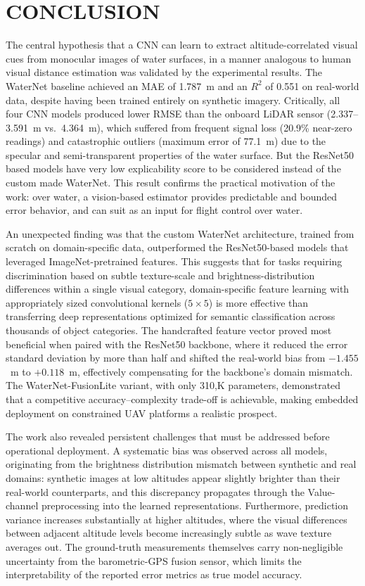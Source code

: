 \section{CONCLUSION}

The central hypothesis that a CNN can learn to extract altitude-correlated visual cues from monocular images of water surfaces, in a manner analogous to human visual distance estimation was validated by the experimental results. The WaterNet baseline achieved an MAE of 1.787~m and an $R^2$ of 0.551 on real-world data, despite having been trained entirely on synthetic imagery. Critically, all four CNN models produced lower RMSE than the onboard LiDAR sensor (2.337--3.591~m vs.\ 4.364~m), which suffered from frequent signal loss (20.9\% near-zero readings) and catastrophic outliers (maximum error of 77.1~m) due to the specular and semi-transparent properties of the water surface. But the ResNet50 based models have very low explicability score to be considered instead of the custom made WaterNet. This result confirms the practical motivation of the work: over water, a vision-based estimator provides predictable and bounded error behavior, and can suit as an input for flight control over water.

An unexpected finding was that the custom WaterNet architecture, trained from scratch on domain-specific data, outperformed the ResNet50-based models that leveraged ImageNet-pretrained features. This suggests that for tasks requiring discrimination based on subtle texture-scale and brightness-distribution differences within a single visual category, domain-specific feature learning with appropriately sized convolutional kernels ($5\times5$) is more effective than transferring deep representations optimized for semantic classification across thousands of object categories. The handcrafted feature vector proved most beneficial when paired with the ResNet50 backbone, where it reduced the error standard deviation by more than half and shifted the real-world bias from $-1.455$~m to $+0.118$~m, effectively compensating for the backbone's domain mismatch. The WaterNet-FusionLite variant, with only 310{,}K parameters, demonstrated that a competitive accuracy--complexity trade-off is achievable, making embedded deployment on constrained UAV platforms a realistic prospect.

The work also revealed persistent challenges that must be addressed before operational deployment. A systematic bias was observed across all models, originating from the brightness distribution mismatch between synthetic and real domains: synthetic images at low altitudes appear slightly brighter than their real-world counterparts, and this discrepancy propagates through the Value-channel preprocessing into the learned representations. Furthermore, prediction variance increases substantially at higher altitudes, where the visual differences between adjacent altitude levels become increasingly subtle as wave texture averages out. The ground-truth measurements themselves carry non-negligible uncertainty from the barometric-GPS fusion sensor, which limits the interpretability of the reported error metrics as true model accuracy.

